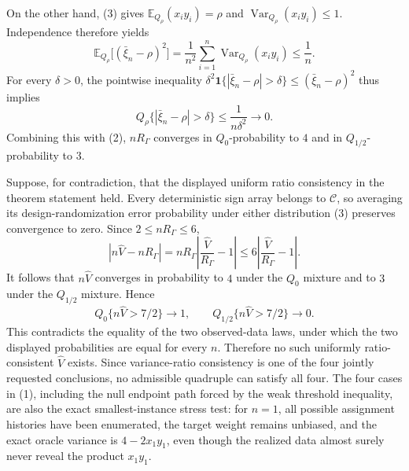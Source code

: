 On the other hand, (3) gives \(\mathbb E_{Q_\rho}(x_i y_i)=\rho\) and \(\operatorname{Var}_{Q_\rho}(x_i y_i)\le1\).  Independence therefore yields
\[
\mathbb E_{Q_\rho}\bigl[(\bar\xi_n-\rho)^2\bigr]
=\frac1{n^2}\sum_{i=1}^n\operatorname{Var}_{Q_\rho}(x_i y_i)
\le\frac1n.
\]
For every \(\delta>0\), the pointwise inequality
\(\delta^2\mathbf 1\{|\bar\xi_n-\rho|>\delta\}\le(\bar\xi_n-\rho)^2\) thus implies
\[
Q_\rho\{|\bar\xi_n-\rho|>\delta\}\le\frac1{n\delta^2}\longrightarrow0.
\]
Combining this with (2), \(nR_\Gamma\) converges in \(Q_0\)-probability to \(4\) and in \(Q_{1/2}\)-probability to \(3\).

Suppose, for contradiction, that the displayed uniform ratio consistency in the theorem statement held.  Every deterministic sign array belongs to \(\mathcal C\), so averaging its design-randomization error probability under either distribution (3) preserves convergence to zero.  Since \(2\le nR_\Gamma\le6\),
\[
|n\widehat V-nR_\Gamma|
=nR_\Gamma\left|\frac{\widehat V}{R_\Gamma}-1\right|
\le6\left|\frac{\widehat V}{R_\Gamma}-1\right|.
\]
It follows that \(n\widehat V\) converges in probability to \(4\) under the \(Q_0\) mixture and to \(3\) under the \(Q_{1/2}\) mixture.  Hence
\[
Q_0\{n\widehat V>7/2\}\longrightarrow1,
\qquad
Q_{1/2}\{n\widehat V>7/2\}\longrightarrow0.
\]
This contradicts the equality of the two observed-data laws, under which the two displayed probabilities are equal for every \(n\).  Therefore no such uniformly ratio-consistent \(\widehat V\) exists.  Since variance-ratio consistency is one of the four jointly requested conclusions, no admissible quadruple can satisfy all four.  The four cases in (1), including the null endpoint path forced by the weak threshold inequality, are also the exact smallest-instance stress test: for \(n=1\), all possible assignment histories have been enumerated, the target weight remains unbiased, and the exact oracle variance is \(4-2x_1y_1\), even though the realized data almost surely never reveal the product \(x_1y_1\).